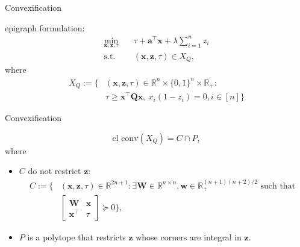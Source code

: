 \documentclass[15pt]{beamer}
\theoremstyle{definition}
\begin{document}
\begin{frame}{Convexification}

epigraph formulation:
\begin{align*}
	\min_{\mathbf{x}, \mathbf{z}, \tau} \quad & \tau + \mathbf{a}^\top \mathbf{x} + \lambda \sum_{i=1}^n z_i \\
	\text{s.t.} \quad 
	& (\mathbf{x}, \mathbf{z}, \tau) \in X_Q,
\end{align*}
where
\begin{align*}
	X_Q := \{& (\mathbf{x}, \mathbf{z}, \tau) \in \mathbb{R}^n \times \{0, 1\}^n \times \mathbb{R}_+ :
	\\  &\tau \ge \mathbf{x}^\top \mathbf{Q} \mathbf{x}, \ x_i(1 - z_i) = 0,  i \in [n] \}
\end{align*}
\end{frame}
%
%
\begin{frame}{Convexification}

\begin{equation*}
	\text{cl conv}(X_Q) = C \cap P,   
\end{equation*}
where
\begin{itemize}
	\item 
	$C$ do not restrict   $\mathbf{z}$:
	\begin{align*}
		C :=
		\{& (\mathbf{x}, \mathbf{z}, \tau) \in \mathbb{R}^{2n+1} : \exists \mathbf{W} \in \mathbb{R}^{n \times n}, \mathbf{w} \in \mathbb{R}_+^{(n+1)(n+2)/2} \text{ such that }\\& \begin{bmatrix} \mathbf{W} & \mathbf{x} \\ \mathbf{x}^\top & \tau \end{bmatrix} \succeq 0 \},
	\end{align*}
	
	\item $P$ is a polytope that restricts $\mathbf{z}$ whose corners are integral in $\mathbf{z}$. 
\end{itemize}


 

\end{frame}
\end{document}
